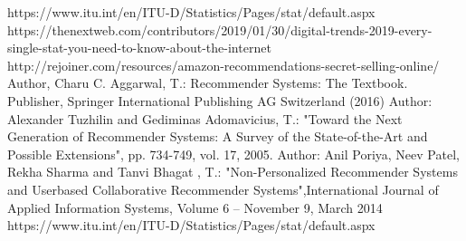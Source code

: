 \documentclass[runningheads]{llncs}
\begin{document}


\newpage
\hfill









\newpage

%
%
%
% 
% 
%
\begin{thebibliography}{8}

https://www.itu.int/en/ITU-D/Statistics/Pages/stat/default.aspx
https://thenextweb.com/contributors/2019/01/30/digital-trends-2019-every-single-stat-you-need-to-know-about-the-internet
http://rejoiner.com/resources/amazon-recommendations-secret-selling-online/
Author, Charu C. Aggarwal, T.: Recommender Systems: The Textbook. Publisher, Springer International Publishing AG Switzerland (2016)
Author: Alexander Tuzhilin and Gediminas Adomavicius, T.: "Toward the Next Generation of Recommender Systems: A Survey of the State-of-the-Art and Possible Extensions", pp. 734-749, vol. 17, 2005.
Author: Anil Poriya, Neev Patel, Rekha Sharma and Tanvi Bhagat , T.: "Non-Personalized Recommender Systems and Userbased Collaborative Recommender Systems",International Journal of Applied Information Systems, Volume 6 – November 9, March 2014
https://www.itu.int/en/ITU-D/Statistics/Pages/stat/default.aspx 


\end{thebibliography}
\end{document}
